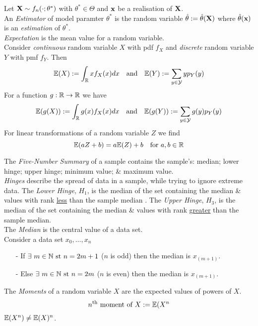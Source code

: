 \documentclass[11pt,a4paper]{article}
\begin{document}
Let $\textbf{X}\sim f_n(\cdot;\theta^*)$ with $\theta^*\in\Theta$ and $\textbf{x}$ be a realisation of $\textbf{X}$.\\
An \textit{Estimator} of model paramter $\theta^*$ is the random variable $\hat\theta:=\hat\theta(\textbf{X})$ where $\hat\theta(\textbf{x})$ is an \textit{estimation} of $\theta^*$.\\

\textit{Expectation} is the mean value for a random variable.\\
Consider \textit{continuous} random variable $X$ with pdf $f_X$ and \textit{discrete} random variable $Y$ with pmf $f_Y$. Then
$$\mathbb{E}(X):=\int_{\mathbb{R}} xf_X(x)dx\quad\text{and}\quad\mathbb{E}(Y):=\sum_{y\in\mathcal{Y}}yp_Y(y)$$
For a function $g:\mathbb{R}\to\mathbb{R}$ we have
$$\mathbb{E}(g(X)):=\int_{\mathbb{R}} g(x)f_X(x)dx\quad\text{and}\quad\mathbb{E}(g(Y)):=\sum_{y\in\mathcal{Y}}g(y)p_Y(y)$$
For linear transformations of a random variable $Z$ we find
$$\mathbb{E}(aZ+b)=a\mathbb{E}(Z)+b\quad\text{for }a,b\in\mathbb{R}$$

The \textit{Five-Number Summary} of a sample contains the sample's: median; lower hinge; upper hinge; minimum value; \& maximum value.\\

\textit{Hinges} describe the spread of data in a sample, while trying to ignore extreme data. The \textit{Lower Hinge}, $H_1$, is the median of the set containing the median \& values with rank \underline{less} than the sample median . The \textit{Upper Hinge}, $H_3$, is the median of the set containing the median \& values with rank \underline{greater} than the sample median.\\

The \textit{Median} is the central value of a data set.\\
Consider a data set $x_0,\dots,x_n$
\begin{itemize}
	\item[-] If $\exists\ m\in\mathbb{N}\text{ st } n=2m+1$ (\ie $n$ is odd) then the median is $x_{(m+1)}$.
	\item[-] Else $\exists\ m\in\mathbb{N}\text{ st } n=2m$ (\ie $n$ is even) then the median is $x_{(m+1)}$.
\end{itemize}

The \textit{Moments} of a random variable $X$ are the expected values of powers of $X$.
$$n^{\text{th}}\text{ moment of }X:=\mathbb{E}(X^n$$
\nb $\mathbb{E}(X^n)\neq\mathbb{E}(X)^n$.\\
\end{document}

